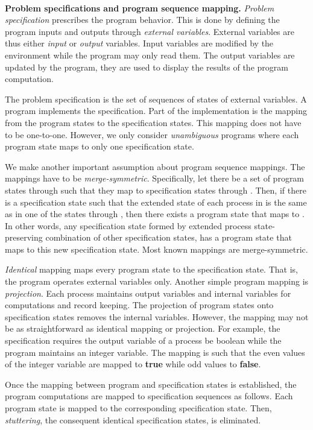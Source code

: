 \documentclass[11pt]{llncs}
\begin{document}
\ \\ \textbf{Problem specifications and program sequence mapping.}
\emph{Problem specification} prescribes the program behavior. This is
done by defining the program inputs and outputs through \emph{external
  variables}. External variables are thus either \emph{input} or
\emph{output} variables. Input variables are modified by the
environment while the program may only read them. The output variables
are updated by the program, they are used to display the results of
the program computation.

The problem specification is the set of sequences of states of
external variables.  A program implements the specification.  Part of
the implementation is the mapping from the program states to the
specification states. This mapping does not have to be
one-to-one. However, we only consider \emph{unambiguous} programs
where each program state maps to only one specification state. 

We make another important assumption about program sequence mappings.
The mappings have to be \emph{merge-symmetric}. Specifically, let
there be a set of program states  through  such that they
map to specification states  through . Then, if there is a
specification state  such that the extended state of each process
 in  is the same as in one of the states  through ,
then there exists a program state  that maps to . In other
words, any specification state formed by extended process
state-preserving combination of other specification states, has a
program state that maps to this new specification state.  Most known
mappings are merge-symmetric.


\emph{Identical} mapping maps every program state to the specification
state.  That is, the program operates external variables only.
Another simple program mapping is \emph{projection}. Each process
maintains output variables and internal variables for computations and
record keeping. The projection of program states onto specification
states removes the internal variables.  However, the mapping may not
be as straightforward as identical mapping or projection. For example,
the specification requires the output variable of a process be boolean
while the program maintains an integer variable. The mapping is such
that the even values of the integer variable are mapped to
\textbf{true} while odd values to \textbf{false}.

Once the mapping between program and specification states is
established, the program computations are mapped to specification
sequences as follows. Each program state is mapped to the
corresponding specification state. Then, \emph{stuttering}, the
consequent identical specification states, is eliminated.
\end{document}
